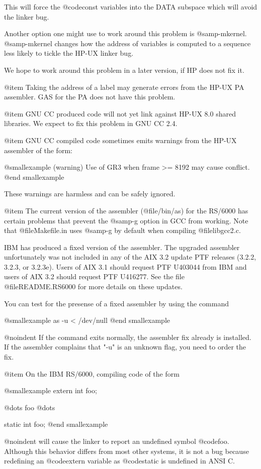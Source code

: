 This will force the @code{const} variables into the DATA subspace which 
will avoid the linker bug.

Another option one might use to work around this problem is
@samp{-mkernel}.  @samp{-mkernel} changes how the address of variables
is computed to a sequence less likely to tickle the HP-UX linker bug.

We hope to work around this problem in a later version, if HP does not
fix it.

@item
Taking the address of a label may generate errors from the HP-UX
PA assembler.  GAS for the PA does not have this problem.

@item
GNU CC produced code will not yet link against HP-UX 8.0 shared libraries.
We expect to fix this problem in GNU CC 2.4.  

@item
GNU CC compiled code sometimes emits warnings from the HP-UX assembler of
the form:

@smallexample
(warning) Use of GR3 when
  frame >= 8192 may cause conflict.
@end smallexample

These warnings are harmless and can be safely ignored.

@item
The current version of the assembler (@file{/bin/as}) for the RS/6000
has certain problems that prevent the @samp{-g} option in GCC from
working.  Note that @file{Makefile.in} uses @samp{-g} by default when
compiling @file{libgcc2.c}.

IBM has produced a fixed version of the assembler.  The upgraded
assembler unfortunately was not included in any of the AIX 3.2 update
PTF releases (3.2.2, 3.2.3, or 3.2.3e).  Users of AIX 3.1 should request
PTF U403044 from IBM and users of AIX 3.2 should request PTF U416277.
See the file @file{README.RS6000} for more details on these updates.

You can test for the presense of a fixed assembler by using the
command

@smallexample
as -u < /dev/null
@end smallexample

@noindent
If the command exits normally, the assembler fix already is installed.
If the assembler complains that "-u" is an unknown flag, you need to
order the fix.

@item
On the IBM RS/6000, compiling code of the form

@smallexample
extern int foo;

@dots{} foo @dots{}

static int foo;
@end smallexample

@noindent
will cause the linker to report an undefined symbol @code{foo}.
Although this behavior differs from most other systems, it is not a
bug because redefining an @code{extern} variable as @code{static}
is undefined in ANSI C.

